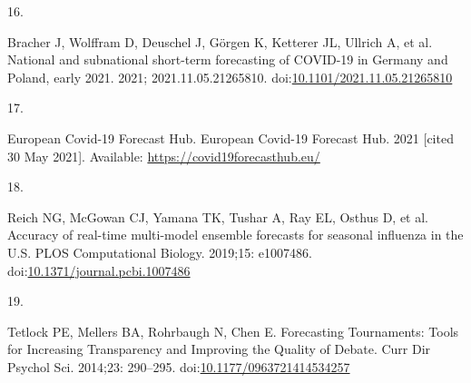 \documentclass[10pt,letterpaper]{article} %
\newlength{\cslhangindent}
\newlength{\csllabelwidth}
\newlength{\cslentryspacingunit} %
\newenvironment{CSLReferences}[2] %
 {%
  \setlength{\parindent}{0pt}
  \ifodd #1
  \let\oldpar\par
  \def\par{\hangindent=\cslhangindent\oldpar}
  \fi
  \setlength{\parskip}{#2\cslentryspacingunit}
 }%
 {}
\newcommand{\CSLLeftMargin}[1]{\parbox[t]{\csllabelwidth}{#1}}
\newcommand{\CSLRightInline}[1]{\parbox[t]{\linewidth - \csllabelwidth}{#1}\break}
\providecommand{\DIFaddbegin}{} %
\providecommand{\DIFaddend}{} %
\providecommand{\DIFdelbegin}{} %
\providecommand{\DIFdelend}{} %
\newcommand{\DIFscaledelfig}{0.5}
\newlength{\DIFdelgraphicswidth} %
\newlength{\DIFdelgraphicsheight} %
\newcommand{\DIFaddincludegraphics}[2][]{{\color{blue}\fbox{\DIFOincludegraphics[#1]{#2}}}} %
\newcommand{\DIFdelincludegraphics}[2][]{%
\sbox{\DIFdelgraphicsbox}{\DIFOincludegraphics[#1]{#2}}%
\settoboxwidth{\DIFdelgraphicswidth}{\DIFdelgraphicsbox} %
\settoboxtotalheight{\DIFdelgraphicsheight}{\DIFdelgraphicsbox} %
\scalebox{\DIFscaledelfig}{%
\parbox[b]{\DIFdelgraphicswidth}{\usebox{\DIFdelgraphicsbox}\\[-\baselineskip] \rule{\DIFdelgraphicswidth}{0em}}\llap{\resizebox{\DIFdelgraphicswidth}{\DIFdelgraphicsheight}{%
\setlength{\unitlength}{\DIFdelgraphicswidth}%
\begin{picture}(1,1)%
\thicklines\linethickness{2pt} %
{\color[rgb]{1,0,0}\put(0,0){\framebox(1,1){}}}%
{\color[rgb]{1,0,0}\put(0,0){\line( 1,1){1}}}%
{\color[rgb]{1,0,0}\put(0,1){\line(1,-1){1}}}%
\end{picture}%
}\hspace*{3pt}}} %
} %
\DeclareRobustCommand{\DIFaddbegin}{\DIFOaddbegin \let\includegraphics\DIFaddincludegraphics} %
\DeclareRobustCommand{\DIFaddend}{\DIFOaddend \let\includegraphics\DIFOincludegraphics} %
\DeclareRobustCommand{\DIFdelbegin}{\DIFOdelbegin \let\includegraphics\DIFdelincludegraphics} %
\DeclareRobustCommand{\DIFdelend}{\DIFOaddend \let\includegraphics\DIFOincludegraphics} %
\begin{document}
\begin{CSLReferences}{0}{0}
\leavevmode{}%
\CSLLeftMargin{16. }
\DIFdelbegin %
\DIFdelend \DIFaddbegin \CSLRightInline{Bracher J, Wolffram D, Deuschel J, Görgen K, Ketterer
JL, Ullrich A, et al. National and subnational short-term forecasting of
{COVID-19} in {Germany} and {Poland}, early 2021. 2021;
2021.11.05.21265810.
doi:\href{https://doi.org/10.1101/2021.11.05.21265810}{10.1101/2021.11.05.21265810}}
\DIFaddend 

\leavevmode{}%
\CSLLeftMargin{17. }
\DIFdelbegin %
\DIFdelend \DIFaddbegin \CSLRightInline{European Covid-19 Forecast Hub. European {Covid-19
Forecast Hub}. 2021 {[}cited 30 May 2021{]}. Available:
\url{https://covid19forecasthub.eu/}}
\DIFaddend 

\leavevmode{}%
\CSLLeftMargin{18. }
\DIFdelbegin %
\DIFdelend \DIFaddbegin \CSLRightInline{Reich NG, McGowan CJ, Yamana TK, Tushar A, Ray EL,
Osthus D, et al. Accuracy of real-time multi-model ensemble forecasts
for seasonal influenza in the {U}.{S}. PLOS Computational Biology.
2019;15: e1007486.
doi:\href{https://doi.org/10.1371/journal.pcbi.1007486}{10.1371/journal.pcbi.1007486}}
\DIFaddend 

\leavevmode{}%
\CSLLeftMargin{19. }
\DIFdelbegin %
\DIFdelend \DIFaddbegin \CSLRightInline{Tetlock PE, Mellers BA, Rohrbaugh N, Chen E. Forecasting
{Tournaments}: {Tools} for {Increasing Transparency} and {Improving} the
{Quality} of {Debate}. Curr Dir Psychol Sci. 2014;23: 290--295.
doi:\href{https://doi.org/10.1177/0963721414534257}{10.1177/0963721414534257}}
\DIFaddend 


\end{CSLReferences}
\end{document}

